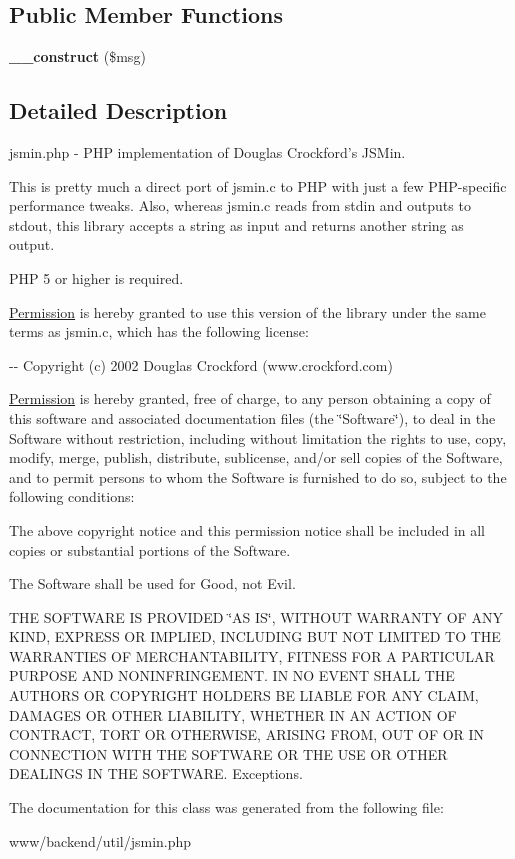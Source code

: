 \subsection*{Public Member Functions}
\begin{DoxyCompactItemize}
\item 
\hypertarget{classJavascriptMinifierException_a964dceaf8a829da849a7e47d35525260}{
{\bfseries \_\-\_\-construct} (\$msg)}
\label{classJavascriptMinifierException_a964dceaf8a829da849a7e47d35525260}

\end{DoxyCompactItemize}


\subsection{Detailed Description}
jsmin.php -\/ PHP implementation of Douglas Crockford's JSMin.

This is pretty much a direct port of jsmin.c to PHP with just a few PHP-\/specific performance tweaks. Also, whereas jsmin.c reads from stdin and outputs to stdout, this library accepts a string as input and returns another string as output.

PHP 5 or higher is required.

\hyperlink{classPermission}{Permission} is hereby granted to use this version of the library under the same terms as jsmin.c, which has the following license:

-\/-\/ Copyright (c) 2002 Douglas Crockford (www.crockford.com)

\hyperlink{classPermission}{Permission} is hereby granted, free of charge, to any person obtaining a copy of this software and associated documentation files (the \char`\"{}Software\char`\"{}), to deal in the Software without restriction, including without limitation the rights to use, copy, modify, merge, publish, distribute, sublicense, and/or sell copies of the Software, and to permit persons to whom the Software is furnished to do so, subject to the following conditions:

The above copyright notice and this permission notice shall be included in all copies or substantial portions of the Software.

The Software shall be used for Good, not Evil.

THE SOFTWARE IS PROVIDED \char`\"{}AS IS\char`\"{}, WITHOUT WARRANTY OF ANY KIND, EXPRESS OR IMPLIED, INCLUDING BUT NOT LIMITED TO THE WARRANTIES OF MERCHANTABILITY, FITNESS FOR A PARTICULAR PURPOSE AND NONINFRINGEMENT. IN NO EVENT SHALL THE AUTHORS OR COPYRIGHT HOLDERS BE LIABLE FOR ANY CLAIM, DAMAGES OR OTHER LIABILITY, WHETHER IN AN ACTION OF CONTRACT, TORT OR OTHERWISE, ARISING FROM, OUT OF OR IN CONNECTION WITH THE SOFTWARE OR THE USE OR OTHER DEALINGS IN THE SOFTWARE. Exceptions. 

The documentation for this class was generated from the following file:\begin{DoxyCompactItemize}
\item 
www/backend/util/jsmin.php\end{DoxyCompactItemize}
